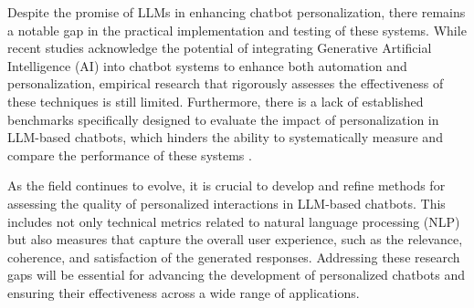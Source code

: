 Despite the promise of LLMs in enhancing chatbot personalization, there remains a notable gap in the practical implementation and testing of these systems. While recent studies acknowledge the potential of integrating Generative Artificial Intelligence (AI) into chatbot systems to enhance both automation and personalization, empirical research that rigorously assesses the effectiveness of these techniques is still limited. Furthermore, there is a lack of established benchmarks specifically designed to evaluate the impact of personalization in LLM-based chatbots, which hinders the ability to systematically measure and compare the performance of these systems \cite{verma2023generative}.

As the field continues to evolve, it is crucial to develop and refine methods for assessing the quality of personalized interactions in LLM-based chatbots. This includes not only technical metrics related to natural language processing (NLP) but also measures that capture the overall user experience, such as the relevance, coherence, and satisfaction of the generated responses. Addressing these research gaps will be essential for advancing the development of personalized chatbots and ensuring their effectiveness across a wide range of applications.
